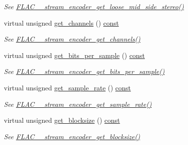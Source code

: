 \begin{DoxyCompactItemize}
\begin{DoxyCompactList}\small\item\em See \hyperlink{group__flac__stream__encoder_ga539ac36925671ac84371a745f8acce17}{F\+L\+A\+C\+\_\+\+\_\+stream\+\_\+encoder\+\_\+get\+\_\+loose\+\_\+mid\+\_\+side\+\_\+stereo()} \end{DoxyCompactList}\item 
virtual unsigned \hyperlink{class_f_l_a_c_1_1_encoder_1_1_stream_a802cd7cfe576323758e48c2f9f68998c}{get\+\_\+channels} () \hyperlink{getopt1_8c_a2c212835823e3c54a8ab6d95c652660e}{const} 
\begin{DoxyCompactList}\small\item\em See \hyperlink{group__flac__stream__encoder_ga4e94f87c0dc9bfc95d57217349aa5c82}{F\+L\+A\+C\+\_\+\+\_\+stream\+\_\+encoder\+\_\+get\+\_\+channels()} \end{DoxyCompactList}\item 
virtual unsigned \hyperlink{class_f_l_a_c_1_1_encoder_1_1_stream_aa9082e0fc12e8a7fd96333f6c0bc405f}{get\+\_\+bits\+\_\+per\+\_\+sample} () \hyperlink{getopt1_8c_a2c212835823e3c54a8ab6d95c652660e}{const} 
\begin{DoxyCompactList}\small\item\em See \hyperlink{group__flac__stream__encoder_gacbd84a241c6718ed4c2688fd558efdcd}{F\+L\+A\+C\+\_\+\+\_\+stream\+\_\+encoder\+\_\+get\+\_\+bits\+\_\+per\+\_\+sample()} \end{DoxyCompactList}\item 
virtual unsigned \hyperlink{class_f_l_a_c_1_1_encoder_1_1_stream_aa1f9ed86faa93d5425db29fc2f4ccd2e}{get\+\_\+sample\+\_\+rate} () \hyperlink{getopt1_8c_a2c212835823e3c54a8ab6d95c652660e}{const} 
\begin{DoxyCompactList}\small\item\em See \hyperlink{group__flac__stream__encoder_gacc8f4820dea783cc0fc2906b6078b333}{F\+L\+A\+C\+\_\+\+\_\+stream\+\_\+encoder\+\_\+get\+\_\+sample\+\_\+rate()} \end{DoxyCompactList}\item 
virtual unsigned \hyperlink{class_f_l_a_c_1_1_encoder_1_1_stream_a7ca33de3e6f852dfaadebb45163bec9f}{get\+\_\+blocksize} () \hyperlink{getopt1_8c_a2c212835823e3c54a8ab6d95c652660e}{const} 
\begin{DoxyCompactList}\small\item\em See \hyperlink{group__flac__stream__encoder_ga75bbef3f55b0e1e18642dd0091ad393e}{F\+L\+A\+C\+\_\+\+\_\+stream\+\_\+encoder\+\_\+get\+\_\+blocksize()} \end{DoxyCompactList}\item 

\end{DoxyCompactItemize}
